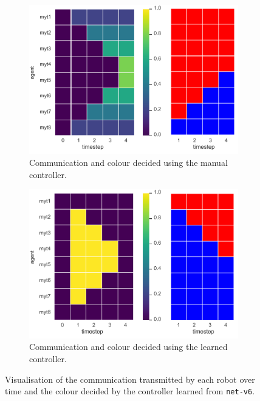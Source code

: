 \begin{figure}[!htb]
	\begin{subfigure}[h]{\textwidth}
		\centering
		\includegraphics[width=.55\textwidth]{contents/images/net-v6/net-v6-manual-0}
		\caption{Communication and colour decided using the manual controller.}
	\end{subfigure}
	\hspace*{\fill}%
	\vspace*{8pt}%
	\hspace*{\fill}%
	\begin{subfigure}[h]{\textwidth}
		\centering			
		\includegraphics[width=.55\textwidth]{contents/images/net-v6/net-v6-learned-0}
		\caption{Communication and colour decided using the learned controller.}
	\end{subfigure}
	\caption[Evaluation of the communication learned by 
	\texttt{net-v6}.]{Visualisation of the communication transmitted by each 
		robot over time and the colour decided by the controller learned from 
		\texttt{net-v6}.}	
	\label{fig:net-v6commcolour}	
	\vspace{-0.5cm}
\end{figure}

